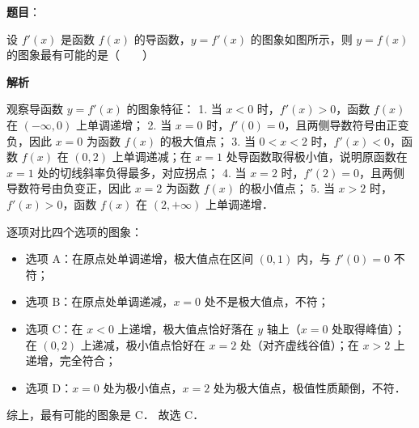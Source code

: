 \begin{answer}

\textbf{题目}：

设 $f'(x)$ 是函数 $f(x)$ 的导函数，$y = f'(x)$ 的图象如图所示，则 $y = f(x)$ 的图象最有可能的是\mbox{（　　）}
\nopagebreak[4]
\begin{center}\end{center}
\nopagebreak[4]
\textbf{解析}
\nopagebreak[4]
\begin{center}\end{center}
\nopagebreak[4]
观察导函数 $y = f'(x)$ 的图象特征：
1. 当 $x < 0$ 时，$f'(x) > 0$，函数 $f(x)$ 在 $(-\infty, 0)$ 上单调递增；
2. 当 $x = 0$ 时，$f'(0) = 0$，且两侧导数符号由正变负，因此 $x = 0$ 为函数 $f(x)$ 的极大值点；
3. 当 $0 < x < 2$ 时，$f'(x) < 0$，函数 $f(x)$ 在 $(0, 2)$ 上单调递减；在 $x = 1$ 处导函数取得极小值，说明原函数在 $x = 1$ 处的切线斜率负得最多，对应拐点；
4. 当 $x = 2$ 时，$f'(2) = 0$，且两侧导数符号由负变正，因此 $x = 2$ 为函数 $f(x)$ 的极小值点；
5. 当 $x > 2$ 时，$f'(x) > 0$，函数 $f(x)$ 在 $(2, +\infty)$ 上单调递增．

逐项对比四个选项的图象：
\begin{itemize}
\item 选项 A：在原点处单调递增，极大值点在区间 $(0, 1)$ 内，与 $f'(0) = 0$ 不符；
\item 选项 B：在原点处单调递减，$x = 0$ 处不是极大值点，不符；
\item 选项 C：在 $x < 0$ 上递增，极大值点恰好落在 $y$ 轴上（$x = 0$ 处取得峰值）；在 $(0, 2)$ 上递减，极小值点恰好在 $x = 2$ 处（对齐虚线谷值）；在 $x > 2$ 上递增，完全符合；
\item 选项 D：$x = 0$ 处为极小值点，$x = 2$ 处为极大值点，极值性质颠倒，不符．
\end{itemize}
综上，最有可能的图象是 C．
故选 C．


\end{answer}
